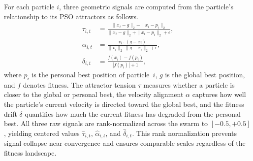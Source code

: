 \documentclass[final,5p,times]{elsarticle}
\begin{document}
For each particle $i$, three geometric signals are computed from the particle's relationship to its PSO attractors as follows.
\begin{equation}
\begin{aligned}
\tau_{i,t} &= \frac{\|x_i - g\|_2 - \|x_i - p_i\|_2}{\|x_i - g\|_2 + \|x_i - p_i\|_2 + \epsilon}, \\
\alpha_{i,t} &= \frac{v_i \cdot (g - x_i)}{\|v_i\|_2 \, \|g - x_i\|_2 + \epsilon}, \\
\delta_{i,t} &= \frac{f(x_i) - f(p_i)}{|f(p_i)| + 1},
\end{aligned}
\label{eq:rank_residual_context}
\end{equation}
where $p_i$ is the personal best position of particle~$i$, $g$ is the global best position, and $f$ denotes fitness.
The attractor tension $\tau$ measures whether a particle is closer to the global or personal best, the velocity alignment $\alpha$ captures how well the particle's current velocity is directed toward the global best, and the fitness drift $\delta$ quantifies how much the current fitness has degraded from the personal best.
All three raw signals are rank-normalized across the swarm to $[-0.5, +0.5]$, yielding centered values $\hat{\tau}_{i,t}$, $\hat{\alpha}_{i,t}$, and $\hat{\delta}_{i,t}$.
This rank normalization prevents signal collapse near convergence and ensures comparable scales regardless of the fitness landscape.
\end{document}
